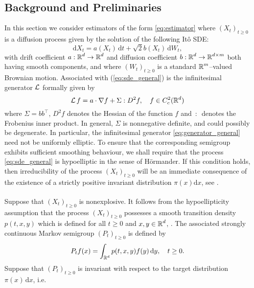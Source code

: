 
\subsection{Background and Preliminaries}




In this section we consider estimators of the form \eqref{eq:estimator} where $(X_t)_{t\ge0}$ is a diffusion process given by the solution of the following It\^{o} SDE:
\begin{equation}
\label{eq:sde_general}
	\mathrm{d}X_t = a(X_t)\,\mathrm{d}t + \sqrt{2}b(X_t)\,\mathrm{d}W_t,
\end{equation}
with drift coefficient $a: \operatorname{\mathbb{R}}^d \rightarrow \operatorname{\mathbb{R}}^d$ and  diffusion coefficient $b:\operatorname{\mathbb{R}}^d \rightarrow \operatorname{\mathbb{R}}^{d\times m}$ both having smooth components, and where $(W_t)_{t\ge0}$ is a standard $\operatorname{\mathbb{R}}^m$--valued Brownian motion.  Associated with (\ref{eq:sde_general}) is the infinitesimal generator $\operatorname{\mathcal{L}}$ formally given by
\begin{equation}
\label{eq:generator_general}
\operatorname{\mathcal{L}} f = a\cdot\nabla f  + \Sigma : D^2 f, \quad f \in C^2_c(\operatorname{\mathbb{R}}^d)
\end{equation}
where $\Sigma = bb^\top$, $D^2 f$ denotes the Hessian of the function $f$ and $\, : \,$ denotes the Frobenius inner product.  In general, $\Sigma$ is nonnegative definite, and could possibly be degenerate.   In particular, the infinitesimal generator \eqref{eq:generator_general} need not be uniformly elliptic.  To ensure that the corresponding semigroup exhibits sufficient smoothing behaviour,  we shall require that  the process \eqref{eq:sde_general} is hypoelliptic in the sense of H{\"o}rmander.   If this condition holds, then irreducibility of the process $(X_t)_{t\ge0}$ will be an immediate consequence of the existence of a strictly positive invariant distribution $\pi(x)\mathrm{d}x$, see \cite{kliemann1987recurrence}.
\\\\
Suppose that $(X_t)_{t\geq 0}$ is nonexplosive.  It follows from the hypoellipticity assumption that the process $(X_t)_{t\geq 0}$ possesses a smooth transition density $p(t,x, y)$ which is defined for all $t \geq 0$ and $x, y \in \operatorname{\mathbb{R}}^d$, \cite[Theorem VII.5.6]{bass1998diffusions}.   The associated strongly continuous Markov semigroup $(P_t)_{t\geq 0}$ is defined by 
\begin{equation}
	P_t f(x) = \int_{\operatorname{\mathbb{R}}^d} p(t, x, y)f(y)\,\mathrm{d}y,\quad t \geq 0.
\end{equation}  
Suppose that $(P_t)_{t\ge0}$ is invariant with respect to the target distribution $\pi(x)\,\mathrm{d}x$, i.e.
